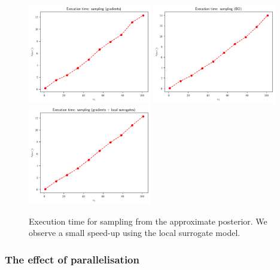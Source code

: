 \begin{figure}[ht]
    \begin{center}
      \includegraphics[width=0.48\textwidth]{./Thesis/images/chapter4/exec_sample_grad.png}
      \includegraphics[width=0.48\textwidth]{./Thesis/images/chapter4/exec_sample_bo.png}\\
      \includegraphics[width=0.48\textwidth]{./Thesis/images/chapter4/exec_sample_grad_fit.png}
    \end{center}
    \caption[Execution time for sampling from the approximate posterior.]{Execution time for sampling from the approximate
      posterior. We observe a small speed-up using the local surrogate model.}
  \label{fig:exec_sample}
\end{figure}

\subsubsection{The effect of parallelisation} \label{subsubsec:parallel}

